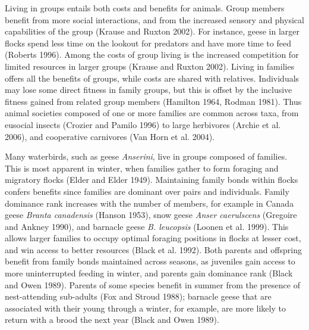 \documentclass[10pt,twocolumn]{paper}
\begin{document}
Living in groups entails both costs and benefits for animals. Group
members benefit from more social interactions, and from the increased
sensory and physical capabilities of the group (Krause and Ruxton 2002).
For instance, geese in larger flocks spend less time on the lookout for
predators and have more time to feed (Roberts 1996). Among the costs of
group living is the increased competition for limited resources in
larger groups (Krause and Ruxton 2002). Living in families offers all
the benefits of groups, while costs are shared with relatives.
Individuals may lose some direct fitness in family groups, but this is
offset by the inclusive fitness gained from related group members
(Hamilton 1964, Rodman 1981). Thus animal societies composed of one or
more families are common across taxa, from eusocial insects (Crozier and
Pamilo 1996) to large herbivores (Archie et al. 2006), and cooperative
carnivores (Van Horn et al. 2004).

Many waterbirds, such as geese \emph{Anserini}, live in groups composed
of families. This is most apparent in winter, when families gather to
form foraging and migratory flocks (Elder and Elder 1949). Maintaining
family bonds within flocks confers benefits since families are dominant
over pairs and individuals. Family dominance rank increases with the
number of members, for example in Canada geese \emph{Branta canadensis}
(Hanson 1953), snow geese \emph{Anser caerulscens} (Gregoire and Ankney
1990), and barnacle geese \emph{B. leucopsis} (Loonen et al. 1999). This
allows larger families to occupy optimal foraging positions in flocks at
lesser cost, and win access to better resources (Black et al. 1992).
Both parents and offspring benefit from family bonds maintained across
seasons, as juveniles gain access to more uninterrupted feeding in
winter, and parents gain dominance rank (Black and Owen 1989). Parents
of some species benefit in summer from the presence of nest-attending
sub-adults (Fox and Stroud 1988); barnacle geese that are associated
with their young through a winter, for example, are more likely to
return with a brood the next year (Black and Owen 1989).
\end{document}
